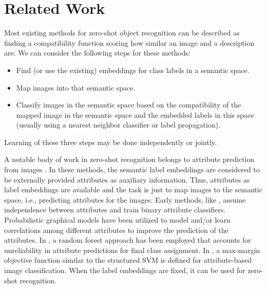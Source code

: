 \documentclass[10pt,twocolumn,letterpaper]{article}
\begin{document}
\section{Related Work} \label{related}
Most existing methods for zero-shot object recognition can be described as finding a compatibility function scoring how
similar an image and a description are.
We can consider the following steps for these methods:
\begin{itemize}
  \item Find (or use the existing) embeddings for class labels in a semantic space.
  \item Map images into that semantic space.
  \item Classify images in the semantic space based on the compatibility of the mapped image in the semantic space and the embedded labels in this space (usually using a nearest neighbor classifier or label propagation).
\end{itemize}
Learning of these three steps may be done independently or jointly.

A notable body of work in zero-shot recognition belongs to attribute prediction from images \cite{lampert09, topicmodel, ajoint11, unified13, suzuki14}.
In these methods, the semantic label embeddings are considered to be externally provided attributes as auxiliary information. Thus, attributes as label embeddings are available and the task is just to map images to the semantic space, i.e., predicting attributes for the images.
Early methods, like \cite{lampert09}, assume independence between attributes and train binary attribute classifiers.
Probabilistic graphical models have been utilized to model and/or learn correlations among different attributes \cite{topicmodel, unified13} to improve the prediction of the attributes.
In \cite{jayaraman14}, a random forest approach has been employed that accounts for unreliability in attribute predictions for final class assignment.
In \cite{Akata2015pami}, a max-margin objective function similar to the structured SVM is defined for attribute-based image classification. When the label embeddings are fixed, it can be used for zero-shot recognition.

\end{document}
